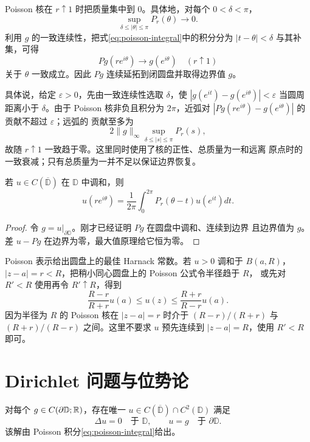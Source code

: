 Poisson 核在 $r\uparrow1$ 时把质量集中到 $0$。具体地，对每个
$0<\delta<\pi$，
\[
 \sup_{\delta\le|\theta|\le\pi}P_r(\theta)\longrightarrow0.
\]
利用 $g$ 的一致连续性，把式\eqref{eq:poisson-integral}中的积分分为
$|t-\theta|<\delta$ 与其补集，可得
\begin{equation}\label{eq:poisson-boundary-uniform}
 Pg(re^{i\theta})\longrightarrow g(e^{i\theta})
 \quad(r\uparrow1)
\end{equation}
关于 $\theta$ 一致成立。因此 $Pg$ 连续延拓到闭圆盘并取得边界值 $g$。

具体说，给定 $\varepsilon>0$，先由一致连续性选取 $\delta$，使
$|g(e^{it})-g(e^{i\theta})|<\varepsilon$ 当圆周距离小于 $\delta$。由于
Poisson 核非负且积分为 $2\pi$，近弧对
$|Pg(re^{i\theta})-g(e^{i\theta})|$ 的贡献不超过 $\varepsilon$；远弧的
贡献至多为
\[
 2\|g\|_\infty
 \sup_{\delta\le |s|\le\pi}P_r(s),
\]
故随 $r\uparrow1$ 一致趋于零。这里同时使用了核的正性、总质量为一和远离
原点时的一致衰减；只有总质量为一并不足以保证边界恢复。

\begin{theorem}\label{thm:poisson-representation}
若 $u\in C(\overline{\mathbb D})$ 在 $\mathbb D$ 中调和，则
\[
 u(re^{i\theta})=\frac1{2\pi}\int_0^{2\pi}
 P_r(\theta-t)u(e^{it})dt.
\]
\end{theorem}

\begin{proof}
令 $g=u|_{\partial\mathbb D}$。刚才已经证明 $Pg$ 在圆盘中调和、连续到边界
且边界值为 $g$。差 $u-Pg$ 在边界为零，最大值原理给它恒为零。
\end{proof}

Poisson 表示给出圆盘上的最佳 Harnack 常数。若 $u>0$ 调和于
$B(a,R)$，$|z-a|=r<R$，把稍小同心圆盘上的 Poisson 公式令半径趋于 $R$，
或先对 $R'<R$ 使用再令 $R'\uparrow R$，得到
\begin{equation}\label{eq:harnack-sharp-disk}
 \frac{R-r}{R+r}u(a)
 \le u(z)\le
 \frac{R+r}{R-r}u(a).
\end{equation}
因为半径为 $R$ 的 Poisson 核在 $|z-a|=r$ 时介于
$(R-r)/(R+r)$ 与 $(R+r)/(R-r)$ 之间。这里不要求 $u$ 预先连续到
$|z-a|=R$，使用 $R'<R$ 即可。

\section{Dirichlet 问题与位势论}

\begin{theorem}[圆盘 Dirichlet 问题]\label{thm:disk-dirichlet-problem}
对每个 $g\in C(\partial\mathbb D;\mathbb{R})$，存在唯一
$u\in C(\overline{\mathbb D})\cap C^2(\mathbb D)$ 满足
\[
 \Delta u=0\quad\text{于 }\mathbb D,
 \qquad u=g\quad\text{于 }\partial\mathbb D.
\]
该解由 Poisson 积分\eqref{eq:poisson-integral}给出。
\end{theorem}

